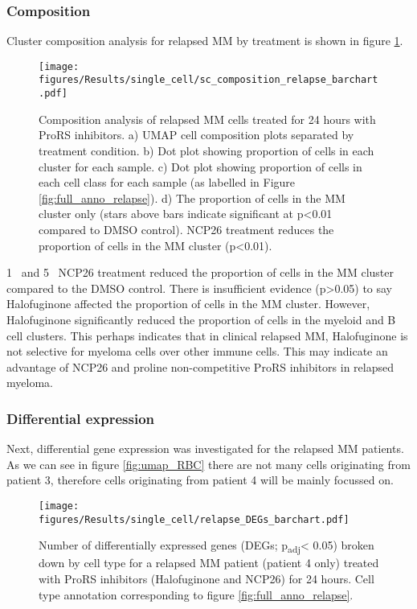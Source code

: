\subsubsection{Composition}
Cluster composition analysis for relapsed MM by treatment is shown in figure \ref{fig:composition_relapse}.
\begin{figure}[htb]
\centering
\texttt{[image: figures/Results/single\_cell/sc\_composition\_relapse\_barchart.pdf]}
\caption[scRNA-seq composition analysis- relapsed MM]{Composition analysis of relapsed MM cells treated for 24 hours with ProRS inhibitors.
    a) UMAP cell composition plots separated by treatment condition.
    b) Dot plot showing proportion of cells in each cluster for each sample.
    c) Dot plot showing proportion of cells in each cell class for each sample (as labelled in Figure \ref{fig:full_anno_relapse}).
    d) The proportion of cells in the MM cluster only (stars above bars indicate significant at p<0.01 compared to DMSO control).
NCP26 treatment reduces the proportion of cells in the MM cluster (p<0.01).}
\label{fig:composition_relapse}
\end{figure}
1\si{\micro\Molar} and 5\si{\micro\Molar} NCP26 treatment reduced the proportion of cells in the MM cluster compared to the DMSO control.
There is insufficient evidence (p>0.05) to say Halofuginone affected the proportion of cells in the MM cluster.
However, Halofuginone significantly reduced the proportion of cells in the myeloid and B cell clusters.
This perhaps indicates that in clinical relapsed MM, Halofuginone is not selective for myeloma cells over other immune cells.
This may indicate an advantage of NCP26 and proline non-competitive ProRS inhibitors in relapsed myeloma. 


\subsubsection{Differential expression}
Next, differential gene expression was investigated for the relapsed MM patients.
As we can see in figure \ref{fig:umap_RBC} there are not many cells originating from patient 3, therefore cells originating from patient 4 will be mainly focussed on.
%
\begin{figure}[htb]
\centering
\texttt{[image: figures/Results/single\_cell/relapse\_DEGs\_barchart.pdf]}
\caption[scRNA-seq DEGs per cell type- relapsed MM]{Number of differentially expressed genes (DEGs; p\textsubscript{adj}< 0.05) broken down by cell type for a relapsed MM patient (patient 4 only) treated with ProRS inhibitors (Halofuginone and NCP26) for 24 hours.
Cell type annotation corresponding to figure \ref{fig:full_anno_relapse}.}
\label{fig:relapse_deg_bar}
\end{figure}

